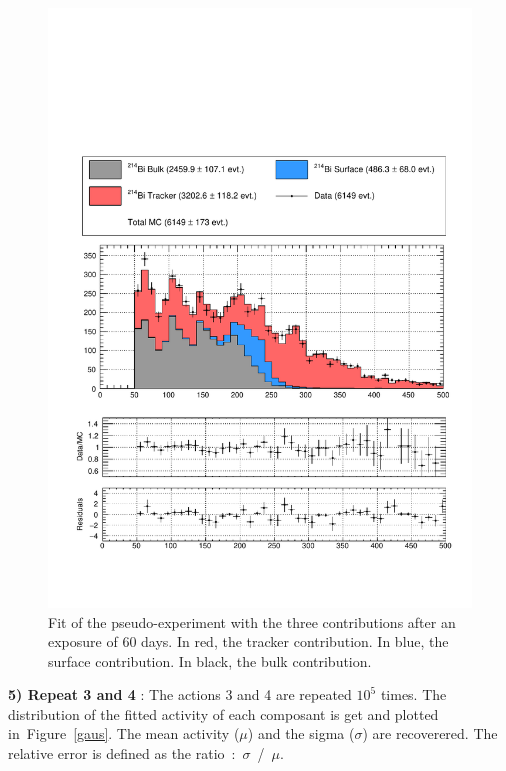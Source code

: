 \documentclass[main.tex]{subfiles}
\begin{document}
\begin{figure}[h!]
\begin{center}
\includegraphics[scale=0.5]{pictures/Chap5/fit_exposure_60.pdf}
\caption{Fit of the pseudo-experiment with the three contributions after an exposure of 60 days. In red, the tracker contribution. In blue, the surface contribution. In black, the bulk contribution.}
\label{fit-pseudo-experiment}
\end{center}
\end{figure}


\bigskip


\noindent \textbf{5) Repeat 3 and 4} : The actions 3 and 4 are repeated $10^\text{5}$ times. The distribution of the fitted activity of each composant is get and plotted in~Figure~\ref{gaus}. The mean activity ($\mu$) and the sigma ($\sigma$) are recoverered. The relative error is defined as the ratio~:~$\sigma$~/~$\mu$.
\end{document}
